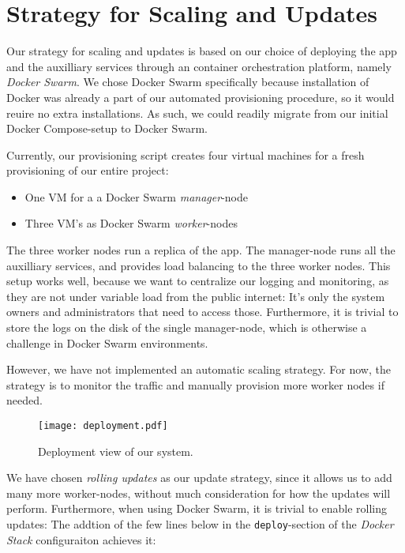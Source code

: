 \section{Strategy for Scaling and Updates}\label{sec:scaling}

Our strategy for scaling and updates is based on our choice of deploying the app and the auxilliary services through an container orchestration platform, namely \textit{Docker Swarm}. We chose Docker Swarm specifically because installation of Docker was already a part of our automated provisioning procedure, so it would reuire no extra installations.
As such, we could readily migrate from our initial Docker Compose-setup to Docker Swarm.

Currently, our provisioning script creates four virtual machines for a fresh provisioning of our entire project:

\begin{itemize}
	\item One VM for a a Docker Swarm \textit{manager}-node
	\item Three VM's as Docker Swarm \textit{worker}-nodes
\end{itemize}

The three worker nodes run a replica of the app.
The manager-node runs all the auxilliary services, and provides load balancing to the three worker nodes.
This setup works well, because we want to centralize our logging and monitoring, as they are not under variable load from the public internet: It's only the system owners and administrators that need to access those.
Furthermore, it is trivial to store the logs on the disk of the single manager-node, which is otherwise a challenge in Docker Swarm environments.

However, we have not implemented an automatic scaling strategy. For now, the strategy is to monitor the traffic and manually provision more worker nodes if needed.

\begin{figure}
	\begin{center}
		\texttt{[image: deployment.pdf]}
	\end{center}
	\caption{Deployment view of our system.}\label{fig:deployment}
\end{figure}

We have chosen \textit{rolling updates} as our update strategy, since it allows us to add many more worker-nodes, without much consideration for how the updates will perform.
Furthermore, when using Docker Swarm, it is trivial to enable rolling updates: The addtion of the few lines below in the \texttt{deploy}-section of the \textit{Docker Stack} configuraiton achieves it:

